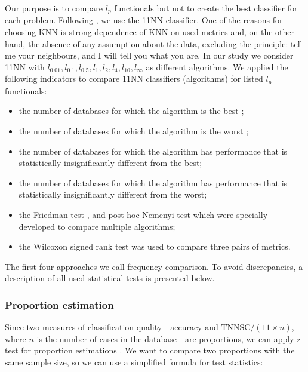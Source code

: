 \documentclass[entropy,article,submit,moreauthors,pdftex]{Definitions/mdpi}
\begin{document}
Our purpose is to compare $l_p$ functionals but not to create the best classifier for each  problem. Following \cite{aggarwal2001}, we use the 11NN  classifier. One of the reasons for choosing KNN is strong dependence of KNN on used metrics and, on the other hand, the absence of any assumption about the data, excluding the principle: tell me your neighbours, and I will tell you what you are. In our study we consider 11NN with $l_{0.01}, l_{0.1}, l_{0.5}, l_1, l_2, l_4, l_{10}, l_\infty$ as different algorithms.
We applied the following indicators to compare 11NN classifiers (algorithms) for listed $l_p$ functionals:
\begin{itemize}
  \item the number of databases for which the algorithm is the best \cite{demvsar2006statistical};
  \item the number of databases for which the algorithm is the worst \cite{demvsar2006statistical};
  \item the number of databases for which the algorithm has performance that is statistically insignificantly different from the best;
  \item the number of databases for which the algorithm has performance that is statistically insignificantly different from the worst;
  \item the Friedman test \cite{friedman1940comparison}, \cite{friedman1937use} and post hoc Nemenyi test \cite{nemenyi1962distribution} which were specially developed to compare multiple algorithms;
  \item the Wilcoxon signed rank test was used to compare three pairs of metrics.
\end{itemize}

The first four approaches we call frequency comparison. To avoid discrepancies, a description of all used statistical tests is presented below.

\subsubsection{Proportion estimation}
Since two measures of classification quality - accuracy and $\text{TNNSC}/(11\times n)$, where $n$ is the number of cases in the database - are proportions, we can apply z-test for proportion estimations \cite{altman2013statistics}. We want to compare two proportions with the same sample size, so we can use a simplified formula for test statistics:
\end{document}
